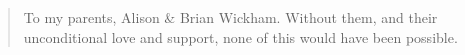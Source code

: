\frontmatter

\begin{quote}
To my parents, Alison \& Brian Wickham. Without them, and their unconditional
love and support, none of this would have been possible.
\end{quote}
